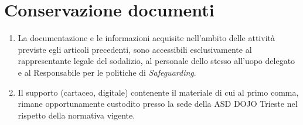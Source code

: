 \documentclass{djtsasddoc}
\begin{document}
	\section{Conservazione documenti}
	\begin{enumerate}
		\item La documentazione e le informazioni acquisite nell'ambito delle attività previste egli articoli precedenti, sono accessibili esclusivamente al rappresentante legale del sodalizio, al personale dello stesso all'uopo delegato e al Responsabile per le politiche di \textit{Safeguarding}.
		\item Il supporto (cartaceo, digitale) contenente il materiale di cui al primo comma, rimane opportunamente custodito presso la sede della ASD DOJO Trieste  nel rispetto della normativa vigente.
	\end{enumerate}
	
\end{document}
